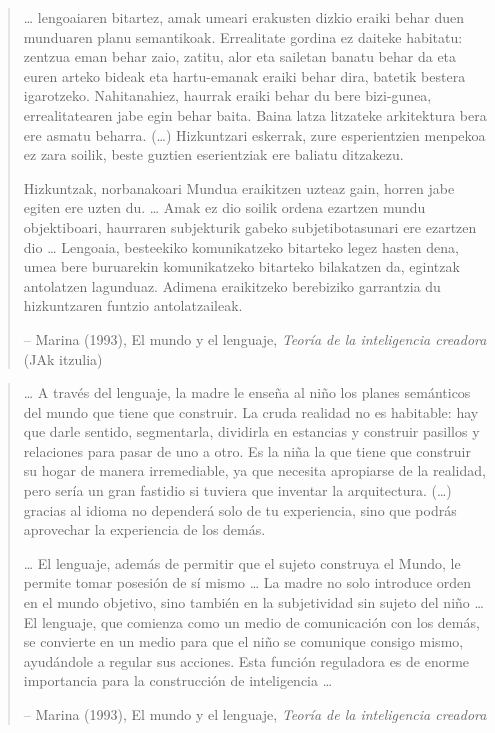 \documentclass[
]{book}
\begin{document}
\begin{quote}
\ldots{} lengoaiaren bitartez, amak umeari erakusten dizkio eraiki behar duen munduaren planu semantikoak. Errealitate gordina ez daiteke habitatu: zentzua eman behar zaio, zatitu, alor eta sailetan banatu behar da eta euren arteko bideak eta hartu-emanak eraiki behar dira, batetik bestera igarotzeko.
Nahitanahiez, haurrak eraiki behar du bere bizi-gunea, errealitatearen jabe egin behar baita. Baina latza litzateke arkitektura bera ere asmatu beharra. (\ldots)
Hizkuntzari eskerrak, zure esperientzien menpekoa ez zara soilik, beste guztien eserientziak ere baliatu ditzakezu.

Hizkuntzak, norbanakoari Mundua eraikitzen uzteaz gain, horren jabe egiten ere uzten du. \ldots{} Amak ez dio soilik ordena ezartzen mundu objektiboari, haurraren subjekturik gabeko subjetibotasunari ere ezartzen dio \ldots{} Lengoaia, besteekiko komunikatzeko bitarteko legez hasten dena, umea bere buruarekin komunikatzeko bitarteko bilakatzen da, egintzak antolatzen lagunduaz. Adimena eraikitzeko berebiziko garrantzia du hizkuntzaren funtzio antolatzaileak.

-- Marina (1993), El mundo y el lenguaje, \emph{Teoría de la inteligencia creadora} (JAk itzulia)
\end{quote}

\begin{quote}
\ldots{} A través del lenguaje, la madre le enseña al niño los planes semánticos del mundo que tiene que construir. La cruda realidad no es habitable: hay que darle sentido, segmentarla, dividirla en estancias y construir pasillos y relaciones para pasar de uno a otro. Es la niña la que tiene que construir su hogar de manera irremediable, ya que necesita apropiarse de la realidad, pero sería un gran fastidio si tuviera que inventar la arquitectura. (\ldots) gracias al idioma no dependerá solo de tu experiencia, sino que podrás aprovechar la experiencia de los demás.

\ldots{} El lenguaje, además de permitir que el sujeto construya el Mundo, le permite tomar posesión de sí mismo \ldots{} La madre no solo introduce orden en el mundo objetivo, sino también en la subjetividad sin sujeto del niño \ldots{} El lenguaje, que comienza como un medio de comunicación con los demás, se convierte en un medio para que el niño se comunique consigo mismo, ayudándole a regular sus acciones. Esta función reguladora es de enorme importancia para la construcción de inteligencia \ldots{}

-- Marina (1993), El mundo y el lenguaje, \emph{Teoría de la inteligencia creadora}
\end{quote}
\end{document}

